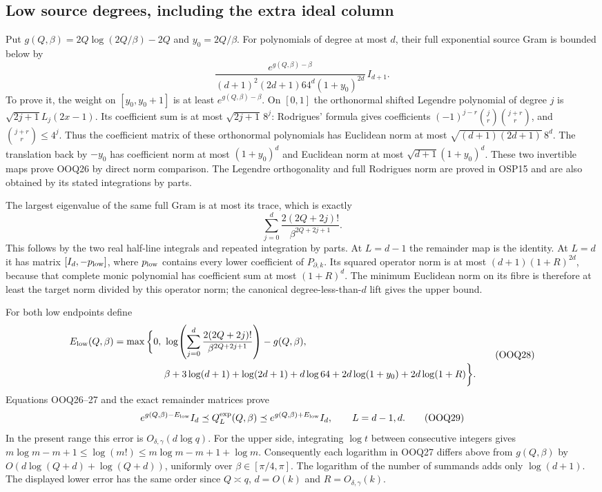 \documentclass[11pt,a4paper]{article}
\begin{document}
\subsection{Low source degrees, including the extra ideal column}

Put $g(Q,\beta)=2Q\log(2Q/\beta)-2Q$ and $y_0=2Q/\beta$.
For polynomials of degree at most $d$, their full exponential
source Gram is bounded below by
\[
\frac{e^{g(Q,\beta)-\beta}}
 {(d+1)^2(2d+1)64^d(1+y_0)^{2d}}\,I_{d+1}.
\tag{OOQ26}
\]
To prove it, the weight on $[y_0,y_0+1]$ is at least
$e^{g(Q,\beta)-\beta}$. On $[0,1]$ the orthonormal shifted
Legendre polynomial of degree $j$ is
$\sqrt{2j+1}L_j(2x-1)$. Its coefficient sum is at most
$\sqrt{2j+1}\,8^j$: Rodrigues' formula gives coefficients
$(-1)^{j-r}\binom jr\binom{j+r}r$, and
$\binom{j+r}r\le4^j$.
Thus the coefficient matrix of these orthonormal polynomials
has Euclidean norm at most
$\sqrt{(d+1)(2d+1)}\,8^d$.
The translation back by $-y_0$ has coefficient norm at most
$(1+y_0)^d$ and Euclidean norm at most
$\sqrt{d+1}(1+y_0)^d$.
These two invertible maps prove OOQ26 by direct norm comparison.
The Legendre orthogonality and full Rodrigues norm are proved
in OSP15 and are also obtained by its stated integrations by parts.

The largest eigenvalue of the same full Gram is at most its trace,
which is exactly
\[
\sum_{j=0}^d\frac{2(2Q+2j)!}{\beta^{2Q+2j+1}} .
\tag{OOQ27}
\]
This follows by the two real half-line integrals and repeated
integration by parts. At $L=d-1$ the remainder map is the
identity. At $L=d$ it has matrix $[I_d,-p_{\rm low}]$,
where $p_{\rm low}$ contains every lower coefficient of
$P_{\partial,k}$. Its squared operator norm is at most
$(d+1)(1+R)^{2d}$, because that complete monic polynomial
has coefficient sum at most $(1+R)^d$.
The minimum Euclidean norm on its fibre is therefore at least
the target norm divided by this operator norm; the canonical
degree-less-than-$d$ lift gives the upper bound.

For both low endpoints define
\[
\begin{split}
E_{\rm low}(Q,\beta)=\max\bigg\{0,\ 
&\log\!\left(\sum_{j=0}^d
       \frac{2(2Q+2j)!}{\beta^{2Q+2j+1}}\right)-g(Q,\beta),\\
&\beta+3\log(d+1)+\log(2d+1)+d\log64
       +2d\log(1+y_0)+2d\log(1+R)\bigg\}.
\end{split}\tag{OOQ28}
\]
Equations OOQ26--27 and the exact remainder matrices prove
\[
e^{g(Q,\beta)-E_{\rm low}}I_d
\preceq Q_L^{\exp}(Q,\beta)
\preceq e^{g(Q,\beta)+E_{\rm low}}I_d,\qquad L=d-1,d.
\tag{OOQ29}
\]
In the present range this error is $O_{\delta,\gamma}(d\log q)$.
For the upper side, integrating $\log t$ between consecutive
integers gives
$m\log m-m+1\le\log(m!)\le m\log m-m+1+\log m$.
Consequently each logarithm in OOQ27 differs above from
$g(Q,\beta)$ by $O(d\log(Q+d)+\log(Q+d))$,
uniformly over $\beta\in[\pi/4,\pi]$. The logarithm of the
number of summands adds only $\log(d+1)$.
The displayed lower error has the same order since
$Q\asymp q$, $d=O(k)$ and $R=O_{\delta,\gamma}(k)$.
\end{document}
